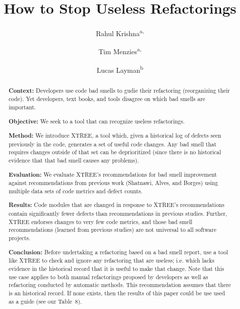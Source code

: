 \documentclass[twocolumn,5p]{elsarticle}
\theoremstyle{break}
\begin{document}
\begin{frontmatter}

\title{How to Stop Useless Refactorings}

\author{Rahul Krishna\textsuperscript{a,}}
\author{Tim Menzies\textsuperscript{a,}}
\author{Lucas Layman\textsuperscript{b}}
\address{\textsuperscript{a}Department of Computer Science, North Carolina State University, Raleigh, NC, USA\\
\textsuperscript{b}Fraunhofer CESE, College Park, USA}
\pagestyle{arabic}

\begin{abstract} 
{\bf Context: } 
Developers use code bad smells to gudie their refactoring (reorganizing their code).
Yet developers, text books, and tools disagree on which bad smells are important.

\noindent 
{\bf Objective: } We seek to a tool that can recognize  useless refactorings.

\noindent
{\bf Method: } We introduce XTREE, a tool which, given a historical log of defects seen previously in the code, generates
a set of useful code changes.
Any bad smell that requires changes outside of that set can be deprioritized 
(since there is no
historical evidence that that bad smell causes any problems).

\noindent
{\bf Evaluation: } We evaluate XTREE's recommendations for bad smell improvement against recommendations from previous work (Shatnawi, Alves, and Borges) using multiple data sets of code metrics and defect counts.  

\noindent
{\bf Results: }Code modules that are changed in response to XTREE's recommendations contain significantly fewer defects than recommendations in previous studies. Further, XTREE endorses changes to very few code metrics, and those bad smell recommendations (learned from previous studies) are not universal to all  software projects.

\noindent
{\bf Conclusion: }
Before undertaking a refactoring based on a bad smell report,
use a tool like XTREE to check and ignore any refactoring   that  are useless; i.e. which lacks evidence
  in the historical record  that it is useful to make that change.
  Note that this use case applies to both manual refactorings proposed by developers
as well as refactoring  conducted by automatic methods.
This recommendation assumes that there is an historical record.
If none exists, then the results of this paper could be use used as a guide (see our
Table~8). 


\end{abstract}
\end{frontmatter}
\end{document}
